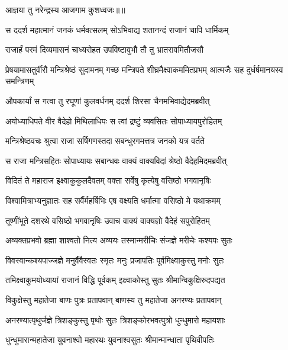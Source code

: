 {आज्ञया तु नरेन्द्रस्य आजगाम कुशध्वजः॥॥} %

\addtocounter{shlokacount}{1}

\twolineshloka
{स ददर्श महात्मानं जनकं धर्मवत्सलम्}
{सोऽभिवाद्य शतानन्दं राजानं चापि धार्मिकम्} %

\twolineshloka
{राजार्हं परमं दिव्यमासनं चाध्यरोहत}
{उपविष्टावुभौ तौ तु भ्रातरावमितौजसौ} %

\threelineshloka
{प्रेषयामासतुर्वीरौ मन्त्रिश्रेष्ठं सुदामनम्}
{गच्छ मन्त्रिपते शीघ्रमैक्ष्वाकममितप्रभम्}
{आत्मजैः सह दुर्धर्षमानयस्व समन्त्रिणम्} %

\twolineshloka
{औपकार्यां स गत्वा तु रघूणां कुलवर्धनम्}
{ददर्श शिरसा चैनमभिवाद्येदमब्रवीत्} %

\twolineshloka
{अयोध्याधिपते वीर वैदेहो मिथिलाधिपः}
{स त्वां द्रष्टुं व्यवसितः सोपाध्यायपुरोहितम्} %

\twolineshloka
{मन्त्रिश्रेष्ठवचः श्रुत्वा राजा सर्षिगणस्तदा}
{सबन्धुरगमत्तत्र जनको यत्र वर्तते} %

\twolineshloka
{स राजा मन्त्रिसहितः सोपाध्यायः सबान्धवः}
{वाक्यं वाक्यविदां श्रेष्ठो वैदेहमिदमब्रवीत्} %

\twolineshloka
{विदितं ते महाराज इक्ष्वाकुकुलदैवतम्}
{वक्ता सर्वेषु कृत्येषु वसिष्ठो भगवानृषिः} %

\twolineshloka
{विश्वामित्राभ्यनुज्ञातः सह सर्वैर्महर्षिभिः}
{एष वक्ष्यति धर्मात्मा वसिष्ठो मे यथाक्रमम्} %

\twolineshloka
{तूष्णींभूते दशरथे वसिष्ठो भगवानृषिः}
{उवाच वाक्यं वाक्यज्ञो वैदेहं सपुरोहितम्} %

\twolineshloka
{अव्यक्तप्रभवो ब्रह्मा शाश्वतो नित्य अव्ययः}
{तस्मान्मरीचिः संजज्ञे मरीचेः कश्यपः सुतः} %

\twolineshloka
{विवस्वान्कश्यपाज्जज्ञे मनुर्वैवैस्वतः स्मृतः}
{मनुः प्रजापतिः पूर्वमिक्ष्वाकुस्तु मनोः सुतः} %

\twolineshloka
{तमिक्ष्वाकुमयोध्यायां राजानं विद्धि पूर्वकम्}
{इक्ष्वाकोस्तु सुतः श्रीमान्विकुक्षिरुदपद्यत} %

\twolineshloka
{विकुक्षेस्तु महातेजा बाणः पुत्रः प्रतापवान्}
{बाणस्य तु महातेजा अनरण्यः प्रतापवान्} %

\twolineshloka
{अनरण्यात्पृथुर्जज्ञे त्रिशङ्कुस्तु पृथोः सुतः}
{त्रिशङ्कोरभवत्पुत्रो धुन्धुमारो महायशाः} %

\twolineshloka
{धुन्धुमारान्महातेजा युवनाश्वो महारथः}
{युवनाश्वसुतः श्रीमान्मान्धाता पृथिवीपतिः} %

